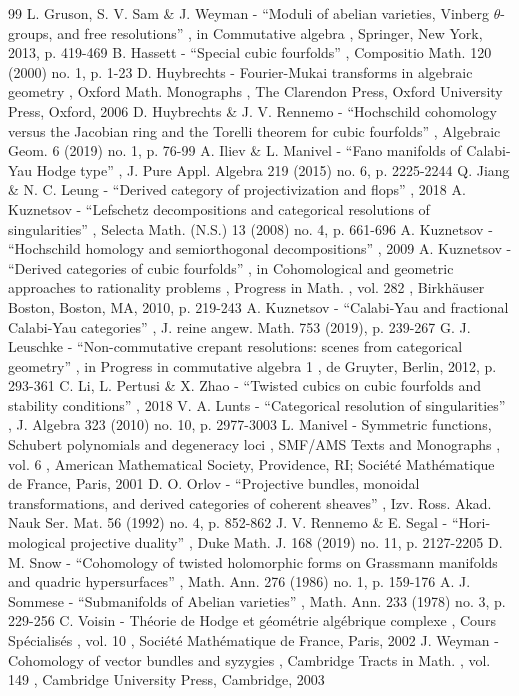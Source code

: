\documentclass[11pt]{article}
\begin{document}
\begin{thebibliography}{99}
 L. Gruson, S. V. Sam \& J. Weyman - “Moduli of abelian varieties, Vinberg $\theta $-groups, and free resolutions” , in Commutative algebra , Springer, New York, 2013, p. 419-469
 B. Hassett - “Special cubic fourfolds” , Compositio Math. 120 (2000) no. 1, p. 1-23
 D. Huybrechts - Fourier-Mukai transforms in algebraic geometry , Oxford Math. Monographs , The Clarendon Press, Oxford University Press, Oxford, 2006
 D. Huybrechts \& J. V. Rennemo - “Hochschild cohomology versus the Jacobian ring and the Torelli theorem for cubic fourfolds” , Algebraic Geom. 6 (2019) no. 1, p. 76-99
 A. Iliev \& L. Manivel - “Fano manifolds of Calabi-Yau Hodge type” , J. Pure Appl. Algebra 219 (2015) no. 6, p. 2225-2244
 Q. Jiang \& N. C. Leung - “Derived category of projectivization and flops” , 2018
 A. Kuznetsov - “Lefschetz decompositions and categorical resolutions of singularities” , Selecta Math. (N.S.) 13 (2008) no. 4, p. 661-696
 A. Kuznetsov - “Hochschild homology and semiorthogonal decompositions” , 2009
 A. Kuznetsov - “Derived categories of cubic fourfolds” , in Cohomological and geometric approaches to rationality problems , Progress in Math. , vol. 282 , Birkhäuser Boston, Boston, MA, 2010, p. 219-243
 A. Kuznetsov - “Calabi-Yau and fractional Calabi-Yau categories” , J. reine angew. Math. 753 (2019), p. 239-267
 G. J. Leuschke - “Non-commutative crepant resolutions: scenes from categorical geometry” , in Progress in commutative algebra 1 , de Gruyter, Berlin, 2012, p. 293-361
 C. Li, L. Pertusi \& X. Zhao - “Twisted cubics on cubic fourfolds and stability conditions” , 2018
 V. A. Lunts - “Categorical resolution of singularities” , J. Algebra 323 (2010) no. 10, p. 2977-3003
 L. Manivel - Symmetric functions, Schubert polynomials and degeneracy loci , SMF/AMS Texts and Monographs , vol. 6 , American Mathematical Society, Providence, RI; Société Mathématique de France, Paris, 2001
 D. O. Orlov - “Projective bundles, monoidal transformations, and derived categories of coherent sheaves” , Izv. Ross. Akad. Nauk Ser. Mat. 56 (1992) no. 4, p. 852-862
 J. V. Rennemo \& E. Segal - “Hori-mological projective duality” , Duke Math. J. 168 (2019) no. 11, p. 2127-2205
 D. M. Snow - “Cohomology of twisted holomorphic forms on Grassmann manifolds and quadric hypersurfaces” , Math. Ann. 276 (1986) no. 1, p. 159-176
 A. J. Sommese - “Submanifolds of Abelian varieties” , Math. Ann. 233 (1978) no. 3, p. 229-256
 C. Voisin - Théorie de Hodge et géométrie algébrique complexe , Cours Spécialisés , vol. 10 , Société Mathématique de France, Paris, 2002
 J. Weyman - Cohomology of vector bundles and syzygies , Cambridge Tracts in Math. , vol. 149 , Cambridge University Press, Cambridge, 2003
\end{thebibliography}
\end{document}
